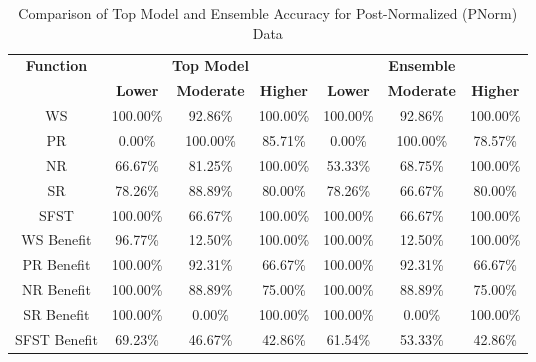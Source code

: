 \begin{table}[H]
\centering
\begin{tabular}{|c|c|c|c|c|c|c|}
\hline
\multirow{2}{*}{\textbf{Function}} & \multicolumn{3}{c|}{\textbf{Top Model}} & \multicolumn{3}{c|}{\textbf{Ensemble}} \\
\cline{2-7}
 & \textbf{Lower} & \textbf{Moderate} & \textbf{Higher} & \textbf{Lower} & \textbf{Moderate} & \textbf{Higher} \\
\hline
WS & 100.00\% & 92.86\% & 100.00\% & 100.00\% & 92.86\% & 100.00\% \\
\hline
PR & 0.00\% & 100.00\% & 85.71\% & 0.00\% & 100.00\% & 78.57\% \\
\hline
NR & 66.67\% & 81.25\% & 100.00\% & 53.33\% & 68.75\% & 100.00\% \\
\hline
SR & 78.26\% & 88.89\% & 80.00\% & 78.26\% & 66.67\% & 80.00\% \\
\hline
SFST & 100.00\% & 66.67\% & 100.00\% & 100.00\% & 66.67\% & 100.00\% \\
\hline
WS Benefit & 96.77\% & 12.50\% & 100.00\% & 100.00\% & 12.50\% & 100.00\% \\
\hline
PR Benefit & 100.00\% & 92.31\% & 66.67\% & 100.00\% & 92.31\% & 66.67\% \\
\hline
NR Benefit & 100.00\% & 88.89\% & 75.00\% & 100.00\% & 88.89\% & 75.00\% \\
\hline
SR Benefit & 100.00\% & 0.00\% & 100.00\% & 100.00\% & 0.00\% & 100.00\% \\
\hline
SFST Benefit & 69.23\% & 46.67\% & 42.86\% & 61.54\% & 53.33\% & 42.86\% \\
\hline
\end{tabular}
\caption{Comparison of Top Model and Ensemble Accuracy for Post-Normalized (PNorm) Data}
\label{reg_spec_tab:featred_post_norm_accuracy}
\end{table}
